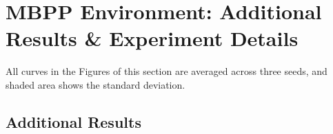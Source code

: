 \documentclass{article}
\theoremstyle{plain}
\begin{document}
\FloatBarrier
\clearpage

\color{black}
\section{MBPP Environment: Additional Results \& Experiment Details}
All curves in the Figures of this section are averaged across three seeds, and shaded area shows the standard deviation.

\subsection{Additional Results}
\label{appx:additional-mbpp-results}
 

\FloatBarrier
\end{document}
